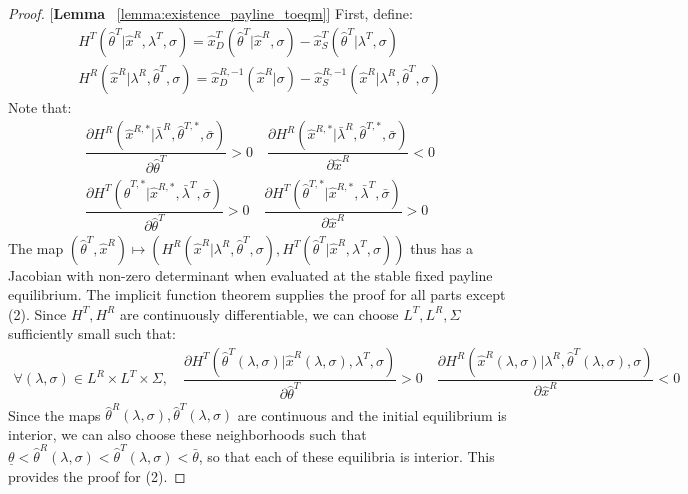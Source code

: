 \begin{proof}{[\textbf{Lemma} ~\ref{lemma:existence_payline_toeqm}]} First, define:
\begin{gather*}
  H^T(\hat{\theta}^T|\hat{x}^R,\lambda^T,\sigma) = \hat{x}^T_D(\hat{\theta}^T|\hat{x}^R,\sigma) - \hat{x}^T_S(\hat{\theta}^T|\lambda^T,\sigma) \\
  H^R(\hat{x}^R|\lambda^R,\hat{\theta}^T,\sigma) = \hat{x}^{R,-1}_D(\hat{x}^R|\sigma) - \hat{x}^{R,-1}_S(\hat{x}^R|\lambda^R,\hat{\theta}^T,\sigma)
\end{gather*}
Note that:
\begin{gather*}
   \dfrac{\partial H^R(\hat{x}^{R,*}|\bar{\lambda}^R,\hat{\theta}^{T,*},\bar{\sigma}) }{\partial \hat{\theta}^T} > 0 \quad \dfrac{\partial H^R(\hat{x}^{R,*}|\bar{\lambda}^R,\hat{\theta}^{T,*},\bar{\sigma}) }{\partial \hat{x}^R} < 0 \\  \dfrac{\partial H^T(\hat{\theta}^{T,*}|\hat{x}^{R,*},\bar{\lambda}^T, \bar{\sigma})}{\partial \hat{\theta}^T} > 0 \quad \dfrac{\partial H^T(\hat{\theta}^{T,*}|\hat{x}^{R,*},\bar{\lambda}^T, \bar{\sigma})}{\partial \hat{x}^R} > 0 
\end{gather*}
The map $(\hat{\theta}^T,\hat{x}^R)\mapsto (H^R(\hat{x}^R|\lambda^R,\hat{\theta}^T,\sigma),H^T(\hat{\theta}^T|\hat{x}^R,\lambda^T,\sigma))$ thus has a Jacobian with non-zero determinant when evaluated at the stable fixed payline equilibrium. The implicit function theorem supplies the proof for all parts except (2). Since $H^T,H^R$ are continuously differentiable, we can choose $L^T,L^R,\Sigma$ sufficiently small such that:
\begin{align*}
  \forall (\lambda,\sigma)\in L^R\times L^T\times \Sigma,\quad \dfrac{\partial H^T(\hat{\theta}^{T}(\lambda,\sigma)|\hat{x}^{R}(\lambda,\sigma),\lambda^T,\sigma)}{\partial \hat{\theta}^T} > 0 \quad \dfrac{\partial H^R(\hat{x}^{R}(\lambda,\sigma)|\lambda^R,\hat{\theta}^{T}(\lambda,\sigma),\sigma) }{\partial \hat{x}^R} < 0
\end{align*}
Since the maps $\hat{\theta}^R(\lambda,\sigma),\hat{\theta}^T(\lambda,\sigma)$ are continuous and the initial equilibrium is interior, we can also choose these neighborhoods such that $\underline{\theta}<\hat{\theta}^R(\lambda,\sigma)<\hat{\theta}^T(\lambda,\sigma)<\bar{\theta}$, so that each of these equilibria is interior. This provides the proof for (2).
\end{proof}

